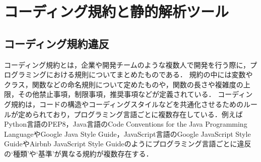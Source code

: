 \documentclass[paper]{ieicej}
\newcommand{\todo}[1]{\colorbox{yellow}{{\bf TODO}:}{\color{red} {\textbf{[#1]}}}}
\begin{document}



\section{コーディング規約と静的解析ツール}\label{chap:background}

\subsection{コーディング規約違反}

コーディング規約とは，企業や開発チームのような複数人で開発を行う際に，プログラミングにおける規則についてまとめたものである．
規約の中には変数やクラス，関数などの命名規則について定めたものや，関数の長さや複雑度の上限，その他禁止事項，制限事項，推奨事項などが定義されている．
コーディング規約は，コードの構造やコーディングスタイルなどを共通化させるためのルールが定められており，プログラミング言語ごとに複数存在している．例えばPython言語のPEP8，Java言語のCode Conventions for the Java Programming LanguageやGoogle Java Style Guide，JavaScript言語のGoogle JavaScript Style GuideやAirbnb JavaScript Style Guideのようにプログラミング言語ごとに違反の`種類'や`基準'が異なる規約が複数存在する．
\end{document}

